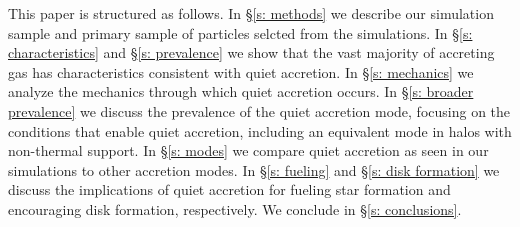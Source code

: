 \documentclass[fleqn,usenatbib]{mnras}
\begin{document}
This paper is structured as follows. 
In \S\ref{s: methods} we describe our simulation sample and primary sample of particles selcted from the simulations.
In \S\ref{s: characteristics} and \S\ref{s: prevalence} we show that the vast majority of accreting gas has characteristics consistent with quiet accretion.
In \S\ref{s: mechanics} we analyze the mechanics through which quiet accretion occurs.
In \S\ref{s: broader prevalence} we discuss the prevalence of the quiet accretion mode, focusing on the conditions that enable quiet accretion, including an equivalent mode in halos with non-thermal support.
In \S\ref{s: modes} we compare quiet accretion as seen in our simulations to other accretion modes.
In \S\ref{s: fueling} and \S\ref{s: disk formation} we discuss the implications of quiet accretion for fueling star formation and encouraging disk formation, respectively.
We conclude in \S\ref{s: conclusions}.


\end{document}

